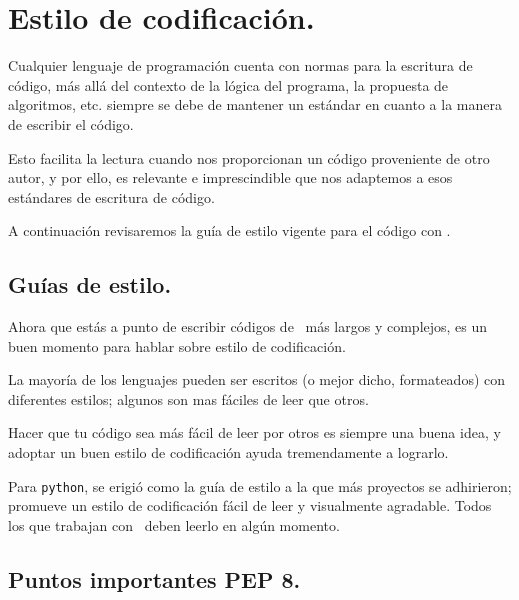 \section{Estilo de codificación.}

Cualquier lenguaje de programación cuenta con normas para la escritura de código, más allá del contexto de la lógica del programa, la propuesta de algoritmos, etc. siempre se debe de mantener un estándar en cuanto a la manera de escribir el código.
\par
Esto facilita la lectura cuando nos proporcionan un código proveniente de otro autor, y por ello, es relevante e imprescindible que nos adaptemos a esos estándares de escritura de código.
\par
A continuación revisaremos la guía de estilo vigente para el código con \python.

\subsection{Guías de estilo.}

Ahora que estás a punto de escribir códigos de \python\ más largos y complejos, es un buen momento para hablar sobre estilo de codificación.
\par
La mayoría de los lenguajes pueden ser escritos (o mejor dicho, formateados) con diferentes estilos; algunos son mas fáciles de leer que otros.
\par
Hacer que tu código sea más fácil de leer por otros es siempre una buena idea, y adoptar un buen estilo de codificación ayuda tremendamente a lograrlo.
\par
Para \texttt{python},  se erigió como la guía de estilo a la que más proyectos se adhirieron; promueve un estilo de codificación fácil de leer y visualmente agradable. Todos los que trabajan con \python\ deben leerlo en algún momento.

\subsection{Puntos importantes PEP 8.}


